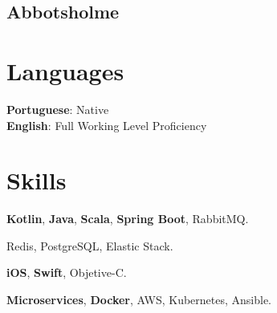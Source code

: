 \documentclass[letterpaper]{deedy-resume} %
\begin{document}
\begin{minipage}[t]{0.33\textwidth}
\sectionspace %

\subsection{Abbotsholme}

\sectionspace %


\section{Languages} 
\textbf{Portuguese}: Native\\
\textbf{English}: Full Working Level Proficiency\\
\sectionspace %


\section{Skills}

\textbf{Kotlin}, \textbf{Java}, \textbf{Scala}, \textbf{Spring Boot}, RabbitMQ.

\vspace{2mm}
Redis, PostgreSQL, Elastic Stack.

\vspace{2mm}
\textbf{iOS}, \textbf{Swift}, Objetive-C.

\vspace{2mm}
\textbf{Microservices}, \textbf{Docker}, AWS, Kubernetes, Ansible.


\sectionspace %

\end{minipage} %
\hfill
%
\end{document}
